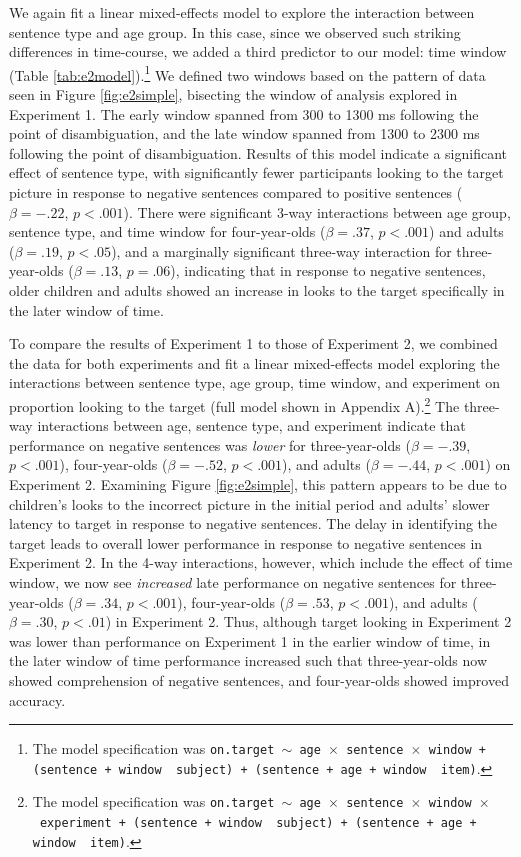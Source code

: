 \documentclass[man]{apa2}
\begin{document}
We again fit a linear mixed-effects model to explore the interaction between sentence type and age group. In this case, since we observed such striking differences in time-course, we added a third predictor to our model: time window (Table \ref{tab:e2model}).\footnote{The model specification was \texttt{on.target $\sim$ age~$\times$~sentence~$\times$~window + (sentence + window~\textbar~subject) +  (sentence + age + window~\textbar~item)}.} We defined two windows based on the pattern of data seen in Figure \ref{fig:e2simple}, bisecting the window of analysis explored in Experiment 1. The early window spanned from 300 to 1300 ms following the point of disambiguation, and the late window spanned from 1300 to 2300 ms following the point of disambiguation. Results of this model indicate a significant effect of sentence type, with significantly fewer participants looking to the target picture in response to negative sentences compared to positive sentences ($\beta = -.22$, $p < .001$).   There were significant 3-way interactions between age group, sentence type, and time window for four-year-olds ($\beta = .37$, $p  < .001$) and adults  ($\beta = .19$, $p <.05$), and a marginally significant three-way interaction for three-year-olds ($\beta = .13$, $p =.06$), indicating that in response to negative sentences, older children and adults showed an increase in looks to the target specifically in the later window of time. 

To compare the results of Experiment 1 to those of Experiment 2, we combined the data for both experiments and fit a linear mixed-effects model exploring the interactions between sentence type, age group, time window, and experiment on proportion looking to the target (full model shown in Appendix A).\footnote{The model specification was \texttt{on.target $\sim$ age~$\times$~sentence~$\times$~window~$\times$~experiment + (sentence + window~\textbar~subject) +  (sentence + age + window~\textbar~item)}.} The three-way interactions between age, sentence type, and experiment indicate that performance on negative sentences was \emph{lower} for three-year-olds ($\beta = - .39$, $p  < .001$), four-year-olds ($\beta = -.52$, $p <  .001$), and adults ($\beta = -.44$, $p  < .001$) on Experiment 2.  Examining Figure \ref{fig:e2simple}, this pattern appears to be due to children's looks to the incorrect picture in the initial period and adults' slower latency to target in response to negative sentences.  The delay in identifying the target leads to overall lower performance in response to negative sentences in Experiment 2.  In the 4-way interactions, however, which include the effect of time window, we now see \emph{increased} late performance on negative sentences for three-year-olds ($\beta = .34$, $p < .001$), four-year-olds ($\beta = .53$, $p < .001$), and adults ($\beta = .30$, $p <  .01$) in Experiment 2.  Thus, although target looking in Experiment 2 was lower than performance on Experiment 1 in the earlier window of time, in the later window of time performance increased such that three-year-olds now showed comprehension of negative sentences, and four-year-olds showed improved accuracy.  
\end{document}

